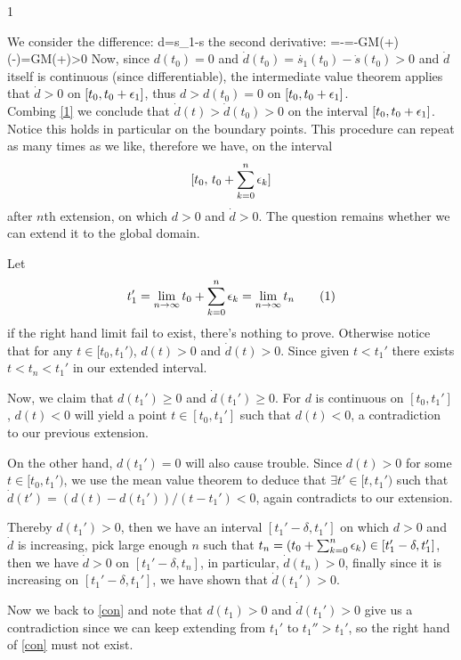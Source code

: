 

\begin{vv286_ms}{1}
\item[]
We consider the difference:
\eq
{
d=s_1-s
}
the second derivative:
\eq
{
=-=-GM(+)(-)=GM(+)>0
}
Now, since $d(t_0)=0$ and 
$
\dot{d}(t_0)=\dot{s_1}(t_0)-\dot{s}(t_0)>0
$
and $\dot{d}$ itself is continuous (since differentiable), the intermediate value theorem applies that $\dot{d}>0$ on $[t_0,t_0+\epsilon_1]$, thus $d>d(t_0)=0$ on $[t_0,t_0+\epsilon_1]$. \\
Combing  \eqref{1} we conclude that $\dot{d}(t)>\dot{d}(t_0)>0$ on the interval $[t_0,t_0+\epsilon_1]$. Notice this holds in particular on the boundary points. This procedure can repeat as many times as we like, therefore we have, on the interval
\[
[t_0,\,t_0+\sum_{k=0}^n\epsilon_k]
\]
after $n$th extension, on which $d>0$ and $\dot{d}>0$. The question remains whether we can extend it to the global domain.

Let 
\[
t_1'=\lim_{n\to\infty}t_0+\sum_{k=0}^n\e_k=\lim_{n\to\infty}t_n\numberthis{con}
\]
if the right hand limit fail to exist, there's nothing to prove. Otherwise notice that for any $t\in[t_0,t_1')$, $d(t)>0$ and $\dot{d}(t)>0$. Since given $t<t_1'$ there exists $t<t_n<t_1'$ in our extended interval.

Now, we claim that $d(t_1')\ge0$ and $\dot{d}(t_1')\ge0$. For $d$ is continuous on $[t_0, t_1']$, $d(t)<0$ will yield a point $t\in [t_0, t_1']$ such that $d(t)<0$, a contradiction to our previous extension.

On the other hand, $d(t_1')=0$ will also cause trouble. Since $d(t)>0$ for some $t\in[t_0,t_1')$, we use the mean value theorem to deduce that $\exists t'\in [t,t_1')$ such that $\dot{d}(t')=(d(t)-d(t_1'))/(t-t_1')<0$, again contradicts to our extension.

Thereby $d(t_1')>0$, then we have an interval $[t_1'-\delta,t_1']$ on which $d>0$ and $\dot{d}$ is increasing, pick large enough $n$ such that $t_n=\left(t_0+\sum_{k=0}^n\epsilon_k\right)\in[t_1'-\delta,t_1']$, then we have $\dot{d}>0$ on $[t_1'-\delta,t_n]$, in particular, $\dot{d}(t_n)>0$, finally since it is increasing on $[t_1'-\delta,t_1']$, we have shown that $\dot{d}(t_1')>0$.

Now we back to \eqref{con}  and note that $d(t_1)>0$ and  $\dot{d}(t_1')>0$ give us a contradiction since we can keep extending from $t_1'$ to $t_1''>t_1'$, so the right hand of \eqref{con} must not exist.


\end{vv286_ms}
